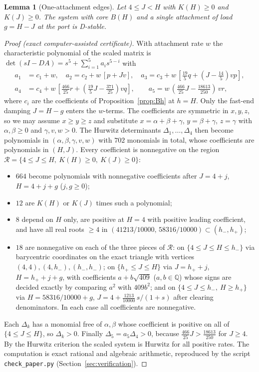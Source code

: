 \documentclass[11pt,a4paper]{article}
\theoremstyle{plain}
\newtheorem{lemma}[theorem]{Lemma}
\theoremstyle{definition}
\theoremstyle{remark}
\begin{document}
\begin{lemma}[One-attachment edges]\label{lem:edgecert}
Let $4\le J<H$ with $K(H)\ge0$ and $K(J)\ge0$. The system with core $B(H)$ and
a single attachment of load $g=H-J$ at the port is D-stable.
\end{lemma}
\begin{proof}[Proof (exact computer-assisted certificate)]
With attachment rate $w$ the characteristic polynomial of the scaled
matrix is $\det(sI-DA)=s^5+\sum_{i=1}^5a_is^{5-i}$ with
\begin{align*}
 a_1&=c_1+w,\quad a_2=c_2+w\,[p+Jv],\quad
 a_3=c_3+w\,[\tfrac{19}{5}q+(J-\tfrac{14}{5})vp],\\
 a_4&=c_4+w\,[\tfrac{466}{25}r+(\tfrac{19}{5}J-\tfrac{371}{25})vq],\qquad
 a_5=w\,(\tfrac{466}{25}J-\tfrac{18613}{250})\,vr,
\end{align*}
where $c_i$ are the coefficients of Proposition~\ref{prop:Bh} at $h=H$. Only
the fast-end damping $J=H-g$ enters the $w$-terms. The coefficients are
symmetric in $x,y,z$, so we may assume $x\ge y\ge z$ and substitute
$x=\alpha+\beta+\gamma$, $y=\beta+\gamma$, $z=\gamma$ with
$\alpha,\beta\ge0$ and $\gamma,v,w>0$. The Hurwitz determinants
$\Delta_1,\dots,\Delta_4$ then become polynomials in $(\alpha,\beta,\gamma,v,w)$
with $702$ monomials in total, whose coefficients are polynomials in $(H,J)$.
Every coefficient is nonnegative on the region
$\mathcal R=\{4\le J\le H,\ K(H)\ge0,\ K(J)\ge0\}$:
\begin{itemize}
\item $664$ become polynomials with nonnegative coefficients after
$J=4+j$, $H=4+j+g$ ($j,g\ge0$);
\item $12$ are $K(H)$ or $K(J)$ times such a polynomial;
\item $8$ depend on $H$ only, are positive at $H=4$ with positive leading
coefficient, and have all real roots $\ge4$ in
$(41213/10000,\,58316/10000)\subset(h_-,h_+)$;
\item $18$ are nonnegative on each of the three pieces of $\mathcal R$: on
$\{4\le J\le H\le h_-\}$ via barycentric coordinates on the exact triangle
with vertices $(4,4),(4,h_-),(h_-,h_-)$; on $\{h_+\le J\le H\}$ via
$J=h_++j$, $H=h_++j+g$, with coefficients $a+b\sqrt{409}$ ($a,b\in\mathbb Q$)
whose signs are decided exactly by comparing $a^2$ with $409b^2$; and
on $\{4\le J\le h_-,\ H\ge h_+\}$ via $H=58316/10000+g$,
$J=4+\tfrac{1213}{10000}\,s/(1+s)$ after clearing denominators. In each case
all coefficients are nonnegative.
\end{itemize}
Each $\Delta_k$ has a monomial free of $\alpha,\beta$ whose coefficient is
positive on all of $\{4\le J\le H\}$, so $\Delta_k>0$. Finally
$\Delta_5=a_5\Delta_4>0$, because $\tfrac{466}{25}J>\tfrac{18613}{250}$ for $J\ge4$.
By the Hurwitz criterion the scaled system is Hurwitz for all positive rates.
The computation is exact rational and algebraic arithmetic, reproduced by the
script \texttt{check\_paper.py} (Section~\ref{sec:verification}).
\end{proof}
\end{document}
